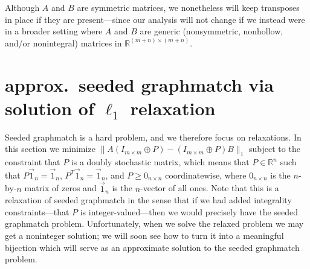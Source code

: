 \documentclass[12pt]{article}
\newcommand{\R}{\mathbb{R}}
\begin{document}
Although $A$ and $B$ are symmetric matrices,
we nonetheless will keep transposes in place if they are
present---since our analysis will
not change if we instead were in a broader setting where $A$ and $B$ are
generic (nonsymmetric, nonhollow, and/or nonintegral) matrices in
$\R^{(m+n)\times (m+n)}$.

\section{ approx.~seeded graphmatch via solution of $\ell_1$ relaxation \label{ell1}}

Seeded graphmatch is a hard problem, and we therefore focus on relaxations.
In this section we minimize
$\|A(I_{m \times m}\oplus P)-(I_{m \times m}\oplus P)B\|_1$ subject to the
constraint that $P$ is a doubly stochastic matrix, which means that
$P \in \R^n$ such that $P \vec{1}_n=\vec{1}_n$, $P^T \vec{1}_n=\vec{1}_n$, and
$P \geq 0_{n \times n}$ coordinatewise, where $0_{n \times n}$ is the
$n$-by-$n$ matrix of zeros and $\vec{1}_n$ is the $n$-vector of all ones.
Note that this is a relaxation of seeded graphmatch in the sense that
if we had added integrality constraints---that $P$ is integer-valued---then we
would precisely have the seeded graphmatch problem.
Unfortunately, when we solve the relaxed problem we may get a noninteger
solution; we will soon see how to  turn it into a meaningful bijection
which will serve as an approximate solution to the seeded graphmatch problem.
\end{document}
